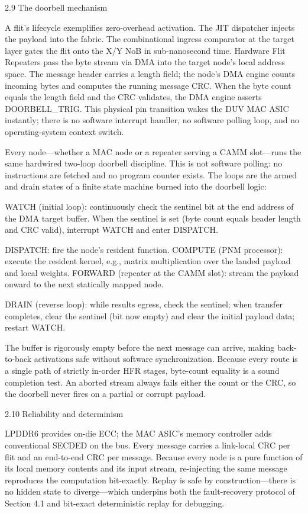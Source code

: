 \documentclass[10pt,twocolumn]{article}
\begin{document}
2.9 The doorbell mechanism

A flit's lifecycle exemplifies zero-overhead activation. The JIT dispatcher injects the payload into the fabric. The combinational ingress comparator at the target layer gates the flit onto the X/Y NoB in sub-nanosecond time. Hardware Flit Repeaters pass the byte stream via DMA into the target node's local address space. The message header carries a length field; the node's DMA engine counts incoming bytes and computes the running message CRC. When the byte count equals the length field and the CRC validates, the DMA engine asserts DOORBELL\_TRIG. This physical pin transition wakes the DUV MAC ASIC instantly; there is no software interrupt handler, no software polling loop, and no operating-system context switch.

Every node---whether a MAC node or a repeater serving a CAMM slot---runs the same hardwired two-loop doorbell discipline. This is not software polling: no instructions are fetched and no program counter exists. The loops are the armed and drain states of a finite state machine burned into the doorbell logic:

WATCH (initial loop): continuously check the sentinel bit at the end address of the DMA target buffer. When the sentinel is set (byte count equals header length and CRC valid), interrupt WATCH and enter DISPATCH.

DISPATCH: fire the node's resident function. COMPUTE (PNM processor): execute the resident kernel, e.g., matrix multiplication over the landed payload and local weights. FORWARD (repeater at the CAMM slot): stream the payload onward to the next statically mapped node.

DRAIN (reverse loop): while results egress, check the sentinel; when transfer completes, clear the sentinel (bit now empty) and clear the initial payload data; restart WATCH.

The buffer is rigorously empty before the next message can arrive, making back-to-back activations safe without software synchronization. Because every route is a single path of strictly in-order HFR stages, byte-count equality is a sound completion test. An aborted stream always fails either the count or the CRC, so the doorbell never fires on a partial or corrupt payload.

2.10 Reliability and determinism

LPDDR6 provides on-die ECC; the MAC ASIC's memory controller adds conventional SECDED on the bus. Every message carries a link-local CRC per flit and an end-to-end CRC per message. Because every node is a pure function of its local memory contents and its input stream, re-injecting the same message reproduces the computation bit-exactly. Replay is safe by construction---there is no hidden state to diverge---which underpins both the fault-recovery protocol of Section 4.1 and bit-exact deterministic replay for debugging.
\end{document}
